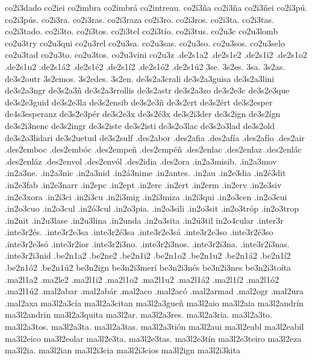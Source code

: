 {co2i3dado 
co2iei 
co2imbra 
co2imbrá 
co2intreau. 
co2í3ña 
co2i3ña 
co2i3ñei 
co2i3pú. 
co2i3pús. 
co2i3ra. 
co2i3ras. 
co2i3raza 
co2i3ro. 
co2i3ros. 
co2i3ta. 
co2i3tas. 
co2i3tado. 
co2i3to. 
co2i3tos. 
co2i3tel 
co2i3tío. 
co2i3tus. 
co2u3c 
co2u3lomb 
co2u3try 
co2u3qui 
co2u3rel 
co2u3sa. 
co2u3sas. 
co2u3so. 
co2u3sos. 
co2u3selo 
co2u3tad 
co2u3to. 
co2u3tos. 
co2u3vini 
co2u3z 
%
%
.de2s1a2 .de2s1e2 .de2s1i2 .de2s1o2 .de2s1u2 .de2s1á2 .de2s1é2 .de2s1í2 .de2s1ó2 .de2s1ú2 
3se. 3s2es. 3sa. 3s2as. de3s2outr 3s2emos. 3s2edes. 3s2en. 
%
de3s2a3crali 
de3s2a3guisa 
de3s2a3lini 
de3s2a3ngr 
de3s2a3ñ 
de3s2a3rrollis 
de3s2astr 
de3s2a3zo 
de3s2e3c 
de3s2e3que 
de3s2e3guid 
de3s2e3la 
de3s2ensib 
de3s2e3ñ 
de3s2ert 
de3s2ért 
de3s2esper de4s3esperanz 
de3s2e3pér 
de3s2e3x 
de3s2é3x 
de3s2i3der 
de3s2ign 
de3s2ígn 
de3s2i3nenc 
de3s2ingr 
de3s2iste 
de3s2isti 
de3s2o3lac 
de3s2o3lad 
de3s2old 
de3s2o3lidari 
de3s2uetud 
de3s2sulf 
%
.des2abor 
.des2afia 
.des2afía 
.des2afío 
.des2air 
.des2emboc 
.des2embóc 
.des2empeñ 
.des2empéñ 
.des2enlac 
.des2enlaz 
.des2enlác 
.des2enláz 
.des2envol 
.des2envól 
.des2idia 
.des2ora 
%
%
.in2a3misib. 
.in2a3mov 
.in2a3ne. 
.in2a3nic 
.in2a3nid 
.in2á3nime 
.in2antes. 
.in2au 
.in2e3dia 
.in2é3dit 
.in2e3fab 
.in2e3narr 
.in2epc 
.in2ept 
.in2erc 
.in2ert 
.in2erm 
.in2erv 
.in2e3siv 
.in2e3xora 
.in2i3ci 
.in2i3cu 
.in2i3mig 
.in2i3miza 
.in2i3qui 
.in2o3cen 
.in2o3cui 
.in2o3cuo 
.in2o3cul 
.in2ó3cul 
.in2o3pia. 
.in2o3sili 
.in2o3sit 
.in2o3tróp 
.in2o3trop 
.in2uit 
.in2u3lase 
.in2u3lina 
.in2unda 
.in2u3sita 
.in2ú3til 
in2o4cular 
%
%
.inter3r 
%
.inte3r2és. .inte3r2e3sa .inte3r2é3sa .inte3r2e3sá .inte3r2e3so .inte3r2é3so .inte3r2e3só .inte3r2ior .inte3r2i3no. .inte3r2i3nos. .inte3r2i3na. .inte3r2i3nas. .inte3r2i3nid 
%
.be2n1a2 .be2ne2 .be2n1i2 .be2n1o2 .be2n1u2 .be2n1á2        .be2n1í2 .be2n1ó2 .be2n1ú2 
%
be3n2ign 
be3n2i3merí 
be3n2i3nés 
be3n2i3nes 
be3n2i3toíta 
%
.ma2l1a2 .ma2le2 .ma2l1i2 .ma2l1o2 .ma2l1u2 .ma2l1á2        .ma2l1í2 .ma2l1ó2 .ma2l1ú2 
%
.mal2abar 
.mal2abár 
.mal2aco 
.mal2acó 
.mal2armad 
.mal2ogr 
.mal2ura 
.mal2axa 
%
ma3l2a3cía 
ma3l2a3citan 
ma3l2a3gueñ 
ma3l2aio 
ma3l2aia 
ma3l2andrín 
ma3l2andrin 
ma3l2a3quita 
ma3l2ar. 
ma3l2a3res. 
ma3l2a3ria. 
ma3l2a3to. 
ma3l2a3tos. 
ma3l2a3ta. 
ma3l2a3tas. 
ma3l2a3tión 
ma3l2aui 
ma3l2eabl 
ma3l2eabil 
ma3l2eico 
ma3l2eolar 
ma3l2e3ta. 
ma3l2e3tas. 
ma3l2e3tín 
ma3l2e3teiro 
ma3l2eza 
ma3l2ia. 
ma3l2ian 
ma3l2i3cia 
ma3l2i3cios 
ma3l2ign 
ma3l2i3kita 
}
